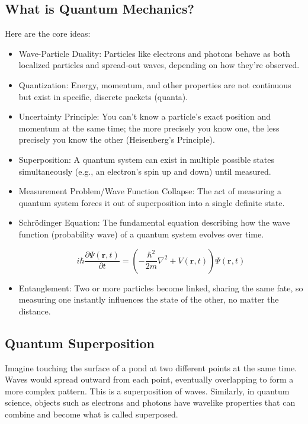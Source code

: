 \documentclass[14pt,a4paper]{extarticle}
\begin{document}
\subsection{What is Quantum Mechanics?}
Here are the core ideas:
\begin{itemize}
  \item Wave-Particle Duality: Particles like electrons and photons behave as both localized particles and spread-out waves, depending on how they're observed.
  \item Quantization: Energy, momentum, and other properties are not continuous but exist in specific, discrete packets (quanta).
  \item Uncertainty Principle: You can't know a particle's exact position and momentum at the same time; the more precisely you know one, the less precisely you know the other (Heisenberg's Principle).
  \item Superposition: A quantum system can exist in multiple possible states simultaneously (e.g., an electron's spin up and down) until measured.
  \item Measurement Problem/Wave Function Collapse: The act of measuring a quantum system forces it out of superposition into a single definite state.
  \item Schrödinger Equation: The fundamental equation describing how the wave function (probability wave) of a quantum system evolves over time.

\begin{equation*}
i\hbar \frac{\partial \Psi(\mathbf{r},t)}{\partial t}
=
\left(
-\frac{\hbar^2}{2m}\nabla^2 + V(\mathbf{r},t)
\right)
\Psi(\mathbf{r},t)
\end{equation*}

  \item Entanglement: Two or more particles become linked, sharing the same fate, so measuring one instantly influences the state of the other, no matter the distance.

\end{itemize}

\subsection{Quantum Superposition}
Imagine touching the surface of a pond at two different points at the same time. Waves would spread outward from each point, eventually overlapping to form a more complex pattern. This is a superposition of waves. Similarly, in quantum science, objects such as electrons and photons have wavelike properties that can combine and become what is called superposed.
\end{document}
